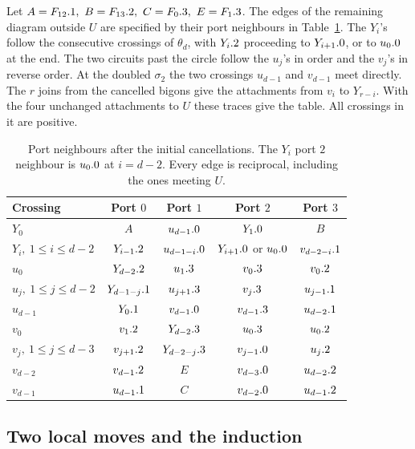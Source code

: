 Let \(A=F_{12}.1,\ B=F_{13}.2,\
C=F_0.3,\ E=F_1.3\). The edges of the remaining
diagram outside \(U\) are specified by their port neighbours
in Table~\ref{tab:ladder}. The \(Y_i\)'s follow the consecutive
crossings of \(\theta_d\), with \(Y_i.2\) proceeding to
\(Y_{i+1}.0\), or to \(u_0.0\) at the end.
The two circuits past the circle follow the \(u_j\)'s in order
and the \(v_j\)'s in reverse order. At the doubled \(\sigma_2\)
the two crossings \(u_{d-1}\) and \(v_{d-1}\) meet directly.
The \(r\) joins from the cancelled bigons give the attachments
from \(v_i\) to \(Y_{r-i}\). With the four unchanged attachments
to \(U\) these traces give the table. All crossings in it are
positive.

\begin{table}[htbp]
\centering
\small
\begin{tabular}{@{}lcccc@{}}
\toprule
Crossing & Port \(0\) & Port \(1\) & Port \(2\) & Port \(3\)\\
\midrule
\(Y_0\) & \(A\) & \(u_{d-1}.0\) & \(Y_1.0\) & \(B\)\\
\(Y_i,\ 1\le i\le d-2\)
 & \(Y_{i-1}.2\) & \(u_{d-1-i}.0\)
 & \(Y_{i+1}.0\) or \(u_0.0\) & \(v_{d-2-i}.1\)\\
\(u_0\)& \(Y_{d-2}.2\)& \(u_1.3\)&\(v_0.3\)&\(v_0.2\)\\
\(u_j,\ 1\le j\le d-2\)&\(Y_{d-1-j}.1\)&\(u_{j+1}.3\)
 &\(v_j.3\)&\(u_{j-1}.1\)\\
\(u_{d-1}\)&\(Y_0.1\)&\(v_{d-1}.0\)
 &\(v_{d-1}.3\)&\(u_{d-2}.1\)\\
\(v_0\)&\(v_1.2\)&\(Y_{d-2}.3\)&\(u_0.3\)&\(u_0.2\)\\
\(v_j,\ 1\le j\le d-3\)&\(v_{j+1}.2\)&\(Y_{d-2-j}.3\)
 &\(v_{j-1}.0\)&\(u_j.2\)\\
\(v_{d-2}\)&\(v_{d-1}.2\)&\(E\)&\(v_{d-3}.0\)&\(u_{d-2}.2\)\\
\(v_{d-1}\)&\(u_{d-1}.1\)&\(C\)&\(v_{d-2}.0\)&\(u_{d-1}.2\)\\
\bottomrule
\end{tabular}
\caption{Port neighbours after the initial cancellations.
The \(Y_i\) port \(2\) neighbour is \(u_0.0\) at
\(i=d-2\). Every edge is reciprocal, including the ones meeting \(U\).}
\label{tab:ladder}
\end{table}

\subsection{Two local moves and the induction}

